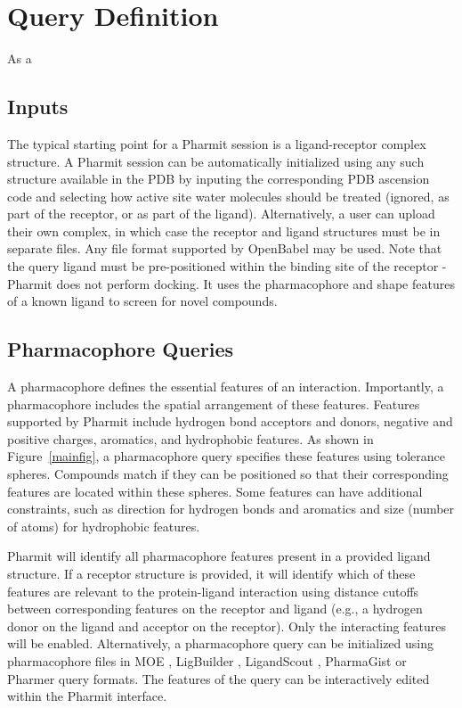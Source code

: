 \section{Query Definition}

As a 

\subsection{Inputs}

The typical starting point for a Pharmit session is a ligand-receptor complex structure. A Pharmit session can be automatically initialized using any such structure available in the PDB by inputing the corresponding PDB ascension code and selecting how active site water molecules should be treated (ignored, as part of the receptor, or as part of the ligand).  Alternatively, a user can upload their own complex, in which case the receptor and ligand structures must be in separate files. Any file format supported by OpenBabel \cite{O_Boyle_2011} may be used.  Note that the query ligand must be pre-positioned within the binding site of the receptor - Pharmit does not perform docking. It uses the pharmacophore and shape features of a known ligand to screen for novel compounds.

\subsection{Pharmacophore Queries}
A pharmacophore \cite{Koes_2015rev,Yang_2010,Leach_2010} defines the essential features of an interaction. Importantly, a pharmacophore includes the spatial arrangement of these features. 
Features supported by Pharmit include hydrogen bond acceptors and donors,  negative and positive charges, aromatics, and hydrophobic features.
As shown in Figure~\ref{mainfig}, a pharmacophore query specifies these features using tolerance spheres.  Compounds match if they can be positioned so that their corresponding features are located within these spheres. Some features can have additional constraints, such as direction for hydrogen bonds and aromatics and size (number of atoms) for hydrophobic features.

Pharmit will identify all pharmacophore features present in a provided ligand structure. If a receptor structure is provided, it will identify which of these features are relevant to the protein-ligand interaction using distance cutoffs between corresponding features on the receptor and ligand (e.g., a hydrogen donor on the ligand and acceptor on the receptor). Only the interacting features will be enabled. Alternatively, a pharmacophore query can be initialized using pharmacophore files in MOE \cite{moe}, LigBuilder \cite{Wang_2000}, LigandScout \cite{Wolber_2005}, PharmaGist \cite{Schneidman_Duhovny_2008} or Pharmer \cite{Koes_2011} query formats.  The features of the query can be interactively edited within the Pharmit interface.


